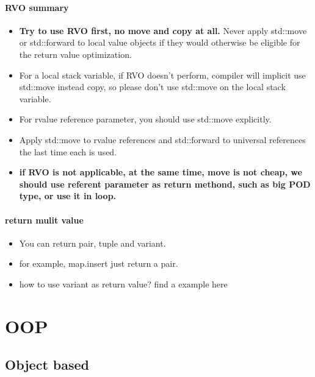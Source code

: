 \documentclass[a4paper,11pt,twoside]{book}
\begin{document}
\subsubsection{RVO summary}

\begin{itemize}

\item \textbf{Try to use RVO first, no move and copy at all.} Never apply std::move or std::forward to local value objects if they would otherwise
be eligible for the return value optimization.

\item For a local stack variable, if RVO doesn't perform, compiler will implicit use std::move instead copy, so please don't use std::move on the local stack variable. 

\item For rvalue reference parameter, you should use std::move explicitly.

\item Apply std::move to rvalue references and std::forward to universal references
the last time each is used.

\item \textbf{if RVO is not applicable, at the same time, move is not cheap, we should use referent parameter as return methond, such as big POD type, or use it in loop.}

\end{itemize}

\subsubsection{return mulit value}
\begin{itemize}
	\item You can return pair, tuple and variant. 
	\item for example, map.insert just return a pair. 
	\item how to use variant as return value? find a example here

\end{itemize}

\chapter{OOP}
\section{Object based}
\end{document}
